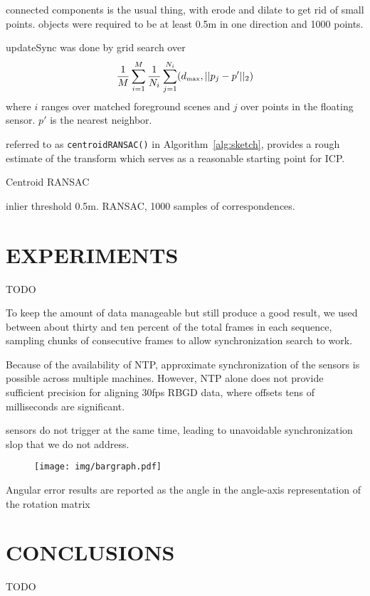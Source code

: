 \documentclass[letterpaper, 10 pt, conference]{ieeeconf}  %
\begin{document}
connected components is the usual thing, with erode and dilate to get rid of small points.  objects were required to be at least 0.5m in one direction and 1000 points.

updateSync was done by grid search over
\newcommand{\dmax}{d_{\mbox{\tiny{max}}}}
\begin{align*}
  \frac{1}{M} \sum_{i=1}^M \frac{1}{N_i} \sum_{j=1}^{N_i}    (\dmax, ||p_j - p'||_2)
\end{align*}
where $i$ ranges over matched foreground scenes and $j$ over points in the floating sensor.  $p'$ is the nearest neighbor.


referred to as \texttt{centroidRANSAC()} in Algorithm~\ref{alg:sketch}, provides a rough estimate of the transform which serves as a reasonable starting point for ICP.


\begin{algorithm}
  \caption{Centroid RANSAC}
  \label{alg:cal}
  \SetLine
  \phantom{\;}
  inlier threshold 0.5m.  RANSAC, 1000 samples of correspondences.
\end{algorithm}



\section{EXPERIMENTS}
TODO

To keep the amount of data manageable but still produce a good result, we used between about thirty and ten percent of the total frames in each sequence, sampling chunks of consecutive frames to allow synchronization search to work.

Because of the availability of NTP, approximate synchronization of the sensors is possible across multiple machines.  However, NTP alone does not provide sufficient precision for aligning 30fps RBGD data, where offsets tens of milliseconds are significant.


sensors do not trigger at the same time, leading to unavoidable synchronization slop that we do not address.



\begin{figure}
  \centering
  \texttt{[image: img/bargraph.pdf]}
  \caption{}
  \label{fig:bargraph}
\end{figure}

\begin{figure}
  \centering
  
  \label{fig:results}
\end{figure}

Angular error results are reported as the angle in the angle-axis representation of the rotation matrix 

\section{CONCLUSIONS}
TODO

%
%
\end{document}
